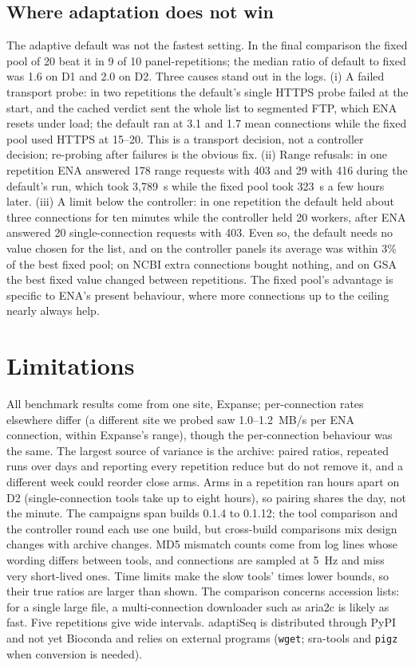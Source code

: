 \documentclass[conference]{IEEEtran}
\begin{document}
\subsection{Where adaptation does not win}
The adaptive default was not the fastest setting. In the final comparison the fixed pool of 20 beat it in 9 of 10 panel-repetitions; the median ratio of default to fixed was 1.6 on D1 and 2.0 on D2. Three causes stand out in the logs. (i) A failed transport probe: in two repetitions the default's single HTTPS probe failed at the start, and the cached verdict sent the whole list to segmented FTP, which ENA resets under load; the default ran at 3.1 and 1.7 mean connections while the fixed pool used HTTPS at 15--20. This is a transport decision, not a controller decision; re-probing after failures is the obvious fix. (ii) Range refusals: in one repetition ENA answered 178 range requests with 403 and 29 with 416 during the default's run, which took 3,789~s while the fixed pool took 323~s a few hours later. (iii) A limit below the controller: in one repetition the default held about three connections for ten minutes while the controller held 20 workers, after ENA answered 20 single-connection requests with 403. Even so, the default needs no value chosen for the list, and on the controller panels its average was within 3\% of the best fixed pool; on NCBI extra connections bought nothing, and on GSA the best fixed value changed between repetitions. The fixed pool's advantage is specific to ENA's present behaviour, where more connections up to the ceiling nearly always help.

\section{Limitations}
All benchmark results come from one site, Expanse; per-connection rates elsewhere differ (a different site we probed saw 1.0--1.2~MB/s per ENA connection, within Expanse's range), though the per-connection behaviour was the same. The largest source of variance is the archive: paired ratios, repeated runs over days and reporting every repetition reduce but do not remove it, and a different week could reorder close arms. Arms in a repetition ran hours apart on D2 (single-connection tools take up to eight hours), so pairing shares the day, not the minute. The campaigns span builds 0.1.4 to 0.1.12; the tool comparison and the controller round each use one build, but cross-build comparisons mix design changes with archive changes. MD5 mismatch counts come from log lines whose wording differs between tools, and connections are sampled at 5~Hz and miss very short-lived ones. Time limits make the slow tools' times lower bounds, so their true ratios are larger than shown. The comparison concerns accession lists: for a single large file, a multi-connection downloader such as aria2c is likely as fast. Five repetitions give wide intervals. adaptiSeq is distributed through PyPI and not yet Bioconda and relies on external programs (\texttt{wget}; sra-tools and \texttt{pigz} when conversion is needed).
\end{document}
